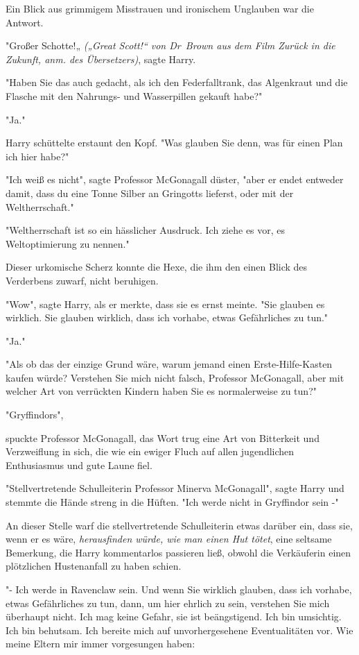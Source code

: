 {Ein Blick aus grimmigem Misstrauen und ironischem Unglauben war die Antwort.

"Großer Schotte!„ \emph{(„Great Scott!“ von Dr~Brown aus dem Film Zurück in die Zukunft, anm. des Übersetzers)}, sagte Harry.

"Haben Sie das auch gedacht, als ich den Federfalltrank, das Algenkraut und die Flasche mit den Nahrungs- und Wasserpillen gekauft habe?"

"Ja."

Harry schüttelte erstaunt den Kopf. "Was glauben Sie denn, was für einen Plan ich hier habe?"

"Ich weiß es nicht", sagte Professor McGonagall düster, "aber er endet entweder damit, dass du eine Tonne Silber an Gringotts lieferst, oder mit der Weltherrschaft."

"Weltherrschaft ist so ein hässlicher Ausdruck. Ich ziehe es vor, es Weltoptimierung zu nennen."

Dieser urkomische Scherz konnte die Hexe, die ihm den einen Blick des Verderbens zuwarf, nicht beruhigen.

"Wow", sagte Harry, als er merkte, dass sie es ernst meinte. "Sie glauben es wirklich. Sie glauben wirklich, dass ich vorhabe, etwas Gefährliches zu tun."

"Ja."

"Als ob das der einzige Grund wäre, warum jemand einen Erste-Hilfe-Kasten kaufen würde? Verstehen Sie mich nicht falsch, Professor McGonagall, aber mit welcher Art von verrückten Kindern haben Sie es normalerweise zu tun?"

"Gryffindors",

spuckte Professor McGonagall, das Wort trug eine Art von Bitterkeit und Verzweiflung in sich, die wie ein ewiger Fluch auf allen jugendlichen Enthusiasmus und gute Laune fiel.

"Stellvertretende Schulleiterin Professor Minerva McGonagall", sagte Harry und stemmte die Hände streng in die Hüften. "Ich werde nicht in Gryffindor sein -"

An dieser Stelle warf die stellvertretende Schulleiterin etwas darüber ein, dass sie, wenn er es wäre, \emph{herausfinden würde, wie man einen Hut tötet}, eine seltsame Bemerkung, die Harry kommentarlos passieren ließ, obwohl die Verkäuferin einen plötzlichen Hustenanfall zu haben schien.

"- Ich werde in Ravenclaw sein. Und wenn Sie wirklich glauben, dass ich vorhabe, etwas Gefährliches zu tun, dann, um hier ehrlich zu sein, verstehen Sie mich überhaupt nicht. Ich mag keine Gefahr, sie ist beängstigend. Ich bin umsichtig. Ich bin behutsam. Ich bereite mich auf unvorhergesehene Eventualitäten vor. Wie meine Eltern mir immer vorgesungen haben:

}

